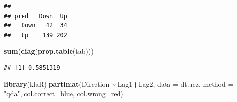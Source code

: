 \documentclass[
]{book}
\newenvironment{Shaded}{\begin{snugshade}}{\end{snugshade}}
\newcommand{\AttributeTok}[1]{\textcolor[rgb]{0.13,0.29,0.53}{#1}}
\newcommand{\FunctionTok}[1]{\textcolor[rgb]{0.13,0.29,0.53}{\textbf{#1}}}
\newcommand{\NormalTok}[1]{#1}
\newcommand{\OtherTok}[1]{\textcolor[rgb]{0.56,0.35,0.01}{#1}}
\newcommand{\SpecialCharTok}[1]{\textcolor[rgb]{0.81,0.36,0.00}{\textbf{#1}}}
\newcommand{\StringTok}[1]{\textcolor[rgb]{0.31,0.60,0.02}{#1}}
\theoremstyle{plain}
\theoremstyle{definition}
\theoremstyle{definition}
\theoremstyle{definition}
\theoremstyle{definition}
\theoremstyle{definition}
\theoremstyle{remark}
\begin{document}
\begin{Shaded}
\end{Shaded}

\begin{verbatim}
##       
## pred   Down  Up
##   Down   42  34
##   Up    139 202
\end{verbatim}

\begin{Shaded}
\begin{Highlighting}[]
\FunctionTok{sum}\NormalTok{(}\FunctionTok{diag}\NormalTok{(}\FunctionTok{prop.table}\NormalTok{(tab)))}
\end{Highlighting}
\end{Shaded}

\begin{verbatim}
## [1] 0.5851319
\end{verbatim}

\begin{Shaded}
\begin{Highlighting}[]
\FunctionTok{library}\NormalTok{(klaR)}
\FunctionTok{partimat}\NormalTok{(Direction }\SpecialCharTok{\textasciitilde{}}\NormalTok{ Lag1}\SpecialCharTok{+}\NormalTok{Lag2, }
         \AttributeTok{data =}\NormalTok{ dt.ucz,}
         \AttributeTok{method =} \StringTok{"qda"}\NormalTok{,}
         \AttributeTok{col.correct=}\StringTok{\textquotesingle{}blue\textquotesingle{}}\NormalTok{,}
         \AttributeTok{col.wrong=}\StringTok{\textquotesingle{}red\textquotesingle{}}\NormalTok{)}
\end{Highlighting}
\end{Shaded}
\end{document}
